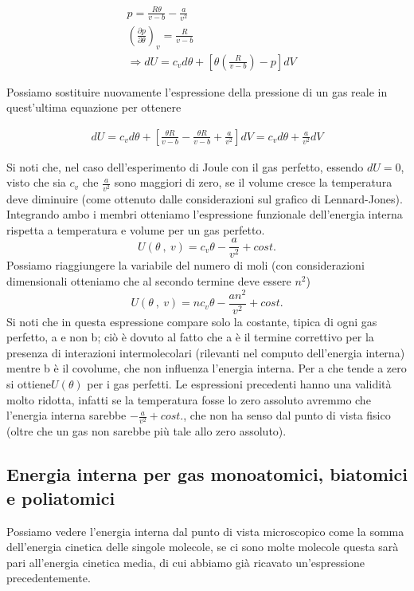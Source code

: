 \documentclass[10pt,a4paper]{article}
\begin{document}
\begin{align*} 
	&p = \frac{R\theta}{v-b}-\frac{a}{v^2}\\
	&\left(\frac{\partial p}{\partial \theta}\right)_v = \frac{R}{v-b}\\
	&\Rightarrow dU = c_v d\theta + \left[ \theta \left(\frac{R}{v-b}\right)-p \right]dV
\end{align*} 

Possiamo sostituire nuovamente l'espressione della pressione di un gas reale in quest'ultima equazione per ottenere

\begin{align*} 
	dU = c_v d\theta + \left[\frac{\theta R}{v-b}-\frac{\theta R}{v-b}+\frac{a}{v^2}\right] dV = c_v d\theta +\frac{a}{v^2}dV
\end{align*} 

Si noti che, nel caso dell'esperimento di Joule con il gas perfetto, essendo \(dU = 0\), visto che sia \(c_v\) che \(\frac{a}{v^2}\) sono maggiori di zero, se il volume cresce la temperatura deve diminuire (come ottenuto dalle considerazioni sul grafico di Lennard-Jones).\\
Integrando ambo i membri otteniamo l'espressione funzionale dell'energia interna rispetta a temperatura e volume per un gas perfetto. 
\[U(\theta\ ,\ v) = c_v\theta - \frac{a}{v^2}+ cost.\]
Possiamo riaggiungere la variabile del numero di moli (con considerazioni dimensionali otteniamo che al secondo termine deve essere \(n^2\))
\[U(\theta\ ,\ v) = n c_v\theta - \frac{a n^2}{v^2}+ cost.\]
Si noti che in questa espressione compare solo la costante, tipica di ogni gas perfetto, a e non b; ciò è dovuto al fatto che a è il termine correttivo per la presenza di interazioni intermolecolari (rilevanti nel computo dell'energia interna) mentre b è il covolume, che non influenza l'energia interna. Per a che tende a zero si ottiene\( U(\theta)\) per i gas perfetti. Le espressioni precedenti hanno una validità molto ridotta, infatti se la temperatura fosse lo zero assoluto avremmo che l'energia interna sarebbe \(-\frac{a}{v^2}+cost.\), che non ha senso dal punto di vista fisico (oltre che un gas non sarebbe più tale allo zero assoluto). 
\subsection{Energia interna per gas monoatomici, biatomici e poliatomici}\label{sec:energia_interna_mono_bi_poli}
Possiamo vedere l'energia interna dal punto di vista microscopico come la somma dell'energia cinetica delle singole molecole, se ci sono molte molecole questa sarà pari all'energia cinetica media, di cui abbiamo già ricavato un'espressione precedentemente. 
\end{document}
